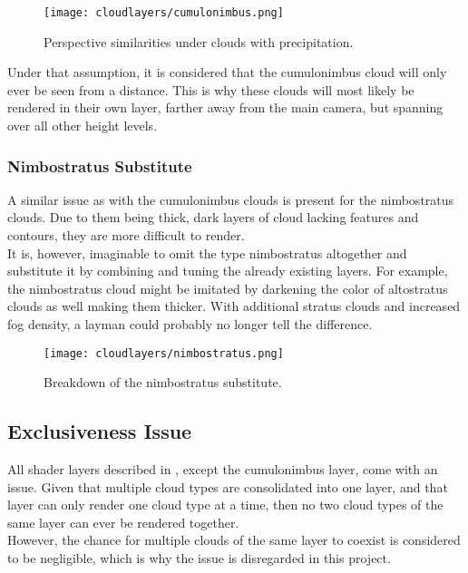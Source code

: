\begin{figure}[H]
    \texttt{[image: cloudlayers/cumulonimbus.png]}
    \caption{Perspective similarities under clouds with \gls{precipitation}.}
    \label{img:cloudlayer:cumulonimbus}
\end{figure}

\noindent
Under that assumption, it is considered that the cumulonimbus cloud will only ever be seen from a distance.
This is why these clouds will most likely be rendered in their own layer, farther away from the main camera, but spanning over all other height levels.

\pagebreak

\subsubsection{Nimbostratus Substitute}
A similar issue as with the cumulonimbus clouds is present for the nimbostratus clouds.
Due to them being thick, dark layers of cloud lacking features and contours, they are more difficult to render.
\\
It is, however, imaginable to omit the type nimbostratus altogether and substitute it by combining and tuning the already existing layers.
For example, the nimbostratus cloud might be imitated by darkening the color of altostratus clouds as well making them thicker. 
With additional stratus clouds and increased fog density, a layman could probably no longer tell the difference.

\begin{figure}[H]
    \texttt{[image: cloudlayers/nimbostratus.png]}
    \caption{Breakdown of the nimbostratus substitute.}
    \label{img:cloudlayer:nimbostratus}
\end{figure}

\subsection{Exclusiveness Issue}
All \gls{shader} layers described in , except the cumulonimbus layer, come with an issue.
Given that multiple cloud types are consolidated into one layer, and that layer can only render one cloud type at a time, then no two cloud types of the same layer can ever be rendered together.
\\
However, the chance for multiple clouds of the same layer to coexist is considered to be negligible, which is why the issue is disregarded in this project.

